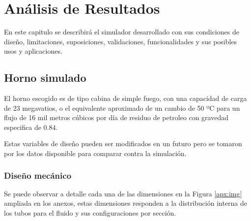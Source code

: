 \chapter{Análisis de Resultados}

\par En este capitulo se describirá el simulador desarrollado con sus condiciones de diseño, limitaciones, suposiciones, validaciones, funcionalidades y sus posibles usos y aplicaciones.

\section{Horno simulado}

\par El horno escogido es de tipo cabina de simple fuego, con una capacidad de carga de 23 megavatios, o el equivalente aproximado de un cambio de 50 ºC para un flujo de 16 mil metros cúbicos por día de residuo de petroleo con gravedad especifica de 0.84.

\par Estas variables de diseño pueden ser modificados en un futuro pero se tomaron por los datos disponible para comparar contra la simulación.

\subsection{Diseño mecánico}

\par Se puede observar a detalle cada una de las dimensiones en la Figura \ref{apx:img} ampliada en los anexos, estas dimensiones responden a la distribución interna de los tubos para el fluido y sus configuraciones por sección.

